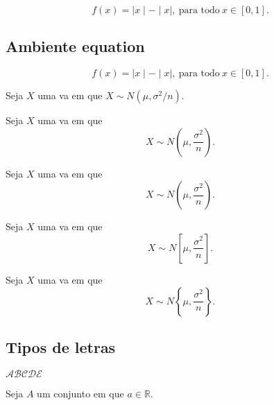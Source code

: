 \documentclass{article}
\begin{document}
 $$f(x)=\mid x \mid - \mid x \mid,\ \mbox{para todo} \ x \in [0,1].$$

\subsection{Ambiente equation}

\begin{equation}
    \label{eq:funcaoJuan}
    f(x)=\mid x \mid - \mid x \mid,\ \mbox{para todo} \ x \in [0,1].
\end{equation}


Seja $X$ uma va em que $X\sim N(\mu, \sigma^2/n)$.

Seja $X$ uma va em que 
$$X\sim N(\mu, \dfrac{\sigma^2}{n}).$$

Seja $X$ uma va em que 
$$X\sim N\left(\mu, \dfrac{\sigma^2}{n}\right).$$

Seja $X$ uma va em que 
$$X\sim N\left[\mu, \dfrac{\sigma^2}{n}\right].$$

Seja $X$ uma va em que 
$$X\sim N\left\{\mu, \dfrac{\sigma^2}{n}\right\}.$$


\subsection{Tipos de letras}


$\mathcal{ABCDE}$


Seja $A$ um conjunto em que  $a\in\mathbb{R}$.
\end{document}
